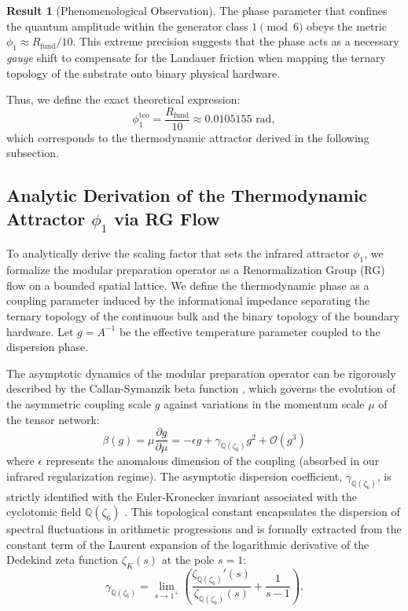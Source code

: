 \documentclass[reprint,aps,pra,superscriptaddress,nofootinbib]{revtex4-2}
\theoremstyle{plain}
\theoremstyle{definition}
\newtheorem{result}[theorem]{Result}
\theoremstyle{remark}
\begin{document}
\begin{result}[Phenomenological Observation]
The phase parameter that confines the quantum amplitude within the generator class $1 \pmod 6$ obeys the metric $\phi_1 \approx R_{\text{fund}}/10$. This extreme precision suggests that the phase acts as a necessary \textit{gauge} shift to compensate for the Landauer friction when mapping the ternary topology of the substrate onto binary physical hardware.
\end{result}

Thus, we define the exact theoretical expression:
\begin{equation}
\phi_1^{\text{teo}} = \frac{R_{\text{fund}}}{10} \approx 0.0105155 \text{ rad},
\label{eq:phi1_teo}
\end{equation}
which corresponds to the thermodynamic attractor derived in the following subsection.

\subsection{Analytic Derivation of the Thermodynamic Attractor $\phi_1$ via RG Flow}
\label{sec:derivacion_phi1}

To analytically derive the scaling factor that sets the infrared attractor $\phi_1$, we formalize the modular preparation operator as a Renormalization Group (RG) flow on a bounded spatial lattice. We define the thermodynamic phase as a coupling parameter induced by the informational impedance separating the ternary topology of the continuous bulk and the binary topology of the boundary hardware. Let $g = A^{-1}$ be the effective temperature parameter coupled to the dispersion phase. 

The asymptotic dynamics of the modular preparation operator can be rigorously described by the Callan-Symanzik beta function \cite{Callan1970}, which governs the evolution of the asymmetric coupling scale $g$ against variations in the momentum scale $\mu$ of the tensor network:
\begin{equation}
\beta(g) = \mu \frac{\partial g}{\partial \mu} = -\epsilon g + \gamma_{\mathbb{Q}(\zeta_6)} g^2 + \mathcal{O}(g^3)
\label{eq:beta_function}
\end{equation}
where $\epsilon$ represents the anomalous dimension of the coupling (absorbed in our infrared regularization regime). The asymptotic dispersion coefficient, $\gamma_{\mathbb{Q}(\zeta_6)}$, is strictly identified with the Euler-Kronecker invariant associated with the cyclotomic field $\mathbb{Q}(\zeta_6)$ \cite{Ihara2006}. This topological constant encapsulates the dispersion of spectral fluctuations in arithmetic progressions and is formally extracted from the constant term of the Laurent expansion of the logarithmic derivative of the Dedekind zeta function $\zeta_K(s)$ at the pole $s=1$:
\begin{equation}
\gamma_{\mathbb{Q}(\zeta_6)} = \lim_{s\to 1^+} \left( \frac{\zeta_{\mathbb{Q}(\zeta_6)}'(s)}{\zeta_{\mathbb{Q}(\zeta_6)}(s)} + \frac{1}{s-1} \right).
\end{equation}
\end{document}
